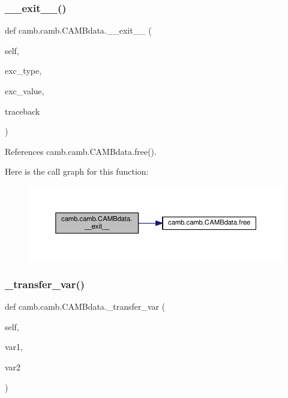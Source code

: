 \mbox{\label{classcamb_1_1camb_1_1CAMBdata_a021893fba3cb6f0703a167961f9df2a4}} 
\subsubsection{\texorpdfstring{\+\_\+\+\_\+exit\+\_\+\+\_\+()}{\_\_exit\_\_()}}
{\footnotesize\ttfamily def camb.\+camb.\+C\+A\+M\+Bdata.\+\_\+\+\_\+exit\+\_\+\+\_\+ (\begin{DoxyParamCaption}\item[{}]{self,  }\item[{}]{exc\+\_\+type,  }\item[{}]{exc\+\_\+value,  }\item[{}]{traceback }\end{DoxyParamCaption})}



References camb.\+camb.\+C\+A\+M\+Bdata.\+free().

Here is the call graph for this function\+:
\nopagebreak
\begin{figure}[H]
\begin{center}
\leavevmode
\includegraphics[width=350pt]{classcamb_1_1camb_1_1CAMBdata_a021893fba3cb6f0703a167961f9df2a4_cgraph}
\end{center}
\end{figure}
\mbox{\label{classcamb_1_1camb_1_1CAMBdata_afe7429cb1e7bf51726bd2793648b42d7}} 
\subsubsection{\texorpdfstring{\+\_\+transfer\+\_\+var()}{\_transfer\_var()}}
{\footnotesize\ttfamily def camb.\+camb.\+C\+A\+M\+Bdata.\+\_\+transfer\+\_\+var (\begin{DoxyParamCaption}\item[{}]{self,  }\item[{}]{var1,  }\item[{}]{var2 }\end{DoxyParamCaption})\hspace{0.3cm}{\ttfamily [private]}}



